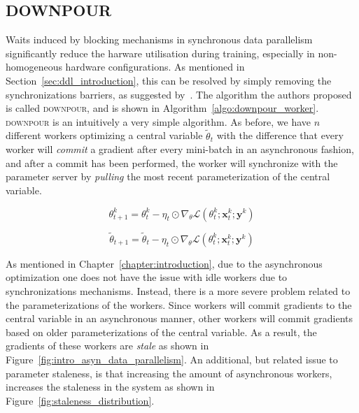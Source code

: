 \subsection{DOWNPOUR}
\label{sec:downpour}

Waits induced by blocking mechanisms in synchronous data parallelism significantly reduce the harware utilisation during training, especially in non-homogeneous hardware configurations. As mentioned in Section~\ref{sec:ddl_introduction}, this can be resolved by simply removing the synchronizations barriers, as suggested by~\cite{dean2012large}. The algorithm the authors proposed is called \textsc{downpour}, and is shown in Algorithm~\ref{algo:downpour_worker}.\\

\textsc{downpour} is an intuitively a very simple algorithm. As before, we have $n$ different workers optimizing a central variable $\tilde{\theta}_t$ with the difference that every worker will \emph{commit} a gradient after every mini-batch in an asynchronous fashion, and after a commit has been performed, the worker will synchronize with the parameter server by \emph{pulling} the most recent parameterization of the central variable.

\begin{equation}
  \label{eq:downpour_worker}
  \theta^k_{t+1} = \theta^k_t - \eta_t \odot \nabla_\theta \mathcal{L}(\theta^k_t;\mathbf{x}^k_t;\mathbf{y}^k)
\end{equation}

\begin{equation}
  \label{eq:downpour_ps}
  \tilde{\theta}_{t+1} = \tilde{\theta}_t - \eta_t \odot \nabla_\theta \mathcal{L}(\theta^k_t;\mathbf{x}^k_t;\mathbf{y}^k)
\end{equation}

As mentioned in Chapter~\ref{chapter:introduction}, due to the asynchronous optimization one does not have the issue with idle workers due to synchronizations mechanisms. Instead, there is a more severe problem related to the parameterizations of the workers. Since workers will commit gradients to the central variable in an asynchronous manner, other workers will commit gradients based on older parameterizations of the central variable. As a result, the gradients of these workers are \emph{stale} as shown in Figure~\ref{fig:intro_asyn_data_parallelism}. An additional, but related issue to parameter staleness, is that increasing the amount of asynchronous workers, increases the staleness in the system as shown in Figure~\ref{fig:staleness_distribution}.

